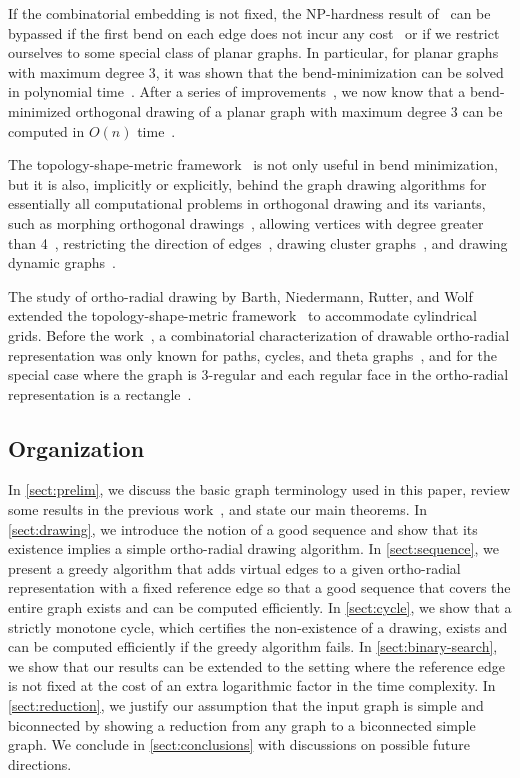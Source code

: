 \documentclass{article}\usepackage[a4paper,margin=20mm]{geometry}
\begin{document}
If the combinatorial embedding is not fixed, the NP-hardness result of~\cite{formann1993drawing,GT96} can be bypassed if the first bend on each edge does not incur any cost~\cite{BRW12} or if we restrict ourselves to some special class of planar graphs. In particular, for planar graphs with maximum degree 3, it was shown that the bend-minimization can be solved in polynomial time~\cite{BLV98}. After a series of improvements~\cite{chang2017bend,didimo2020optimal,didimo2018bend}, we now know that a bend-minimized orthogonal drawing of a planar graph with maximum degree $3$ can be computed in $O(n)$ time~\cite{didimo2020optimal}.

The topology-shape-metric framework~\cite{tamassia1987embedding} is not only useful in bend minimization, but it is also, implicitly or explicitly, behind the graph drawing algorithms for essentially all computational problems in orthogonal drawing and its variants, such as morphing orthogonal drawings~\cite{biedl2013morphing},  allowing vertices with degree greater than 4~\cite{BDPP99,KM98,papakostas2000efficient},  restricting the direction of edges~\cite{didimo2014complexity,durocher2014drawing}, drawing cluster graphs~\cite{brandes2004draw}, and drawing dynamic graphs~\cite{brandes1998dynamic}.

The study of ortho-radial drawing by Barth, Niedermann, Rutter, and Wolf~\cite{barth2023topology} extended the topology-shape-metric framework~\cite{tamassia1987embedding} to accommodate cylindrical grids. Before the work~\cite{barth2023topology}, a combinatorial characterization of drawable ortho-radial representation was only known for paths, cycles, and theta graphs~\cite{hasheminezhad2009ortho}, and for the special case where the graph is 3-regular and each regular face in the ortho-radial representation is a rectangle~\cite{hasheminezhad2010rectangular}.

\subsection{Organization}

In \cref{sect:prelim}, we discuss the basic graph terminology used in this paper, review some results in the previous work~\cite{barth2023topology}, and state our main theorems. In \cref{sect:drawing}, we introduce the notion of a good sequence and  show that its existence implies a simple  ortho-radial drawing algorithm. In \cref{sect:sequence}, we present a greedy algorithm that adds virtual edges to a given ortho-radial representation with a fixed reference edge so that a good sequence that covers the entire graph exists and can be computed efficiently. In \cref{sect:cycle}, we show that a strictly monotone cycle, which certifies the non-existence of a drawing, exists and can be computed efficiently if the greedy algorithm fails. In \cref{sect:binary-search}, we show that our results can be extended to the setting where the reference edge is not fixed at the cost of an extra logarithmic factor in the time complexity.
In \cref{sect:reduction}, we justify our assumption that the input graph is simple and  biconnected by showing a reduction from any graph to a  biconnected simple graph. We conclude in \cref{sect:conclusions} with discussions on possible future directions.
\end{document}
